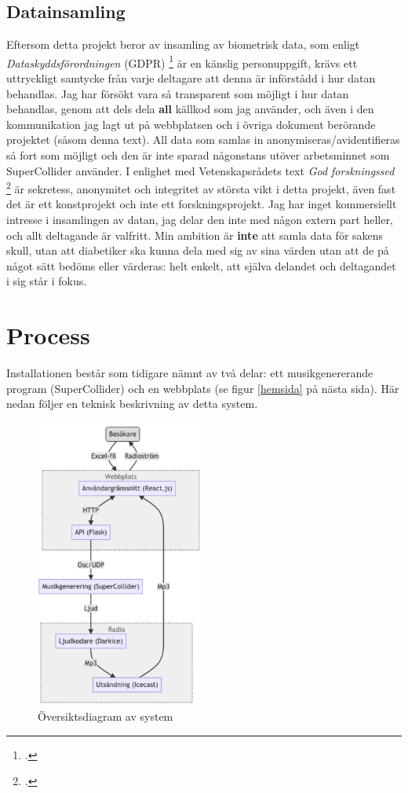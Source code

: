 \documentclass[11pt, a4paper]{article} %
\begin{document}
\subsection*{Datainsamling}
Eftersom detta projekt beror av insamling av biometrisk data, som enligt \emph{Dataskyddsförordningen} (GDPR) \footcite{integritetsskyddsmyndigheten_kansliga_nodate} är en känslig personuppgift, krävs ett uttryckligt samtycke från varje deltagare att denna är införstådd i hur datan behandlas. Jag har försökt vara så transparent som möjligt i hur datan behandlas, genom att dels dela \textbf{all} källkod som jag använder, och även i den kommunikation jag lagt ut på webbplatsen och i övriga dokument berörande projektet (såsom denna text). All data som samlas in anonymiseras/avidentifieras så fort som möjligt och den är inte sparad någonstans utöver arbetsminnet som SuperCollider använder. I enlighet med Vetenskapsrådets text \emph{God forskningssed} \footcite[s. 40-41]{vetenskapsradet_god_2017} är sekretess, anonymitet och integritet av största vikt i detta projekt, även fast det är ett konstprojekt och inte ett forskningsprojekt. Jag har inget kommersiellt intresse i insamlingen av datan, jag delar den inte med någon extern part heller, och allt deltagande är valfritt. Min ambition är \textbf{inte} att samla data för sakens skull, utan att diabetiker ska kunna dela med sig av sina värden utan att de på något sätt bedöms eller värderas: helt enkelt, att själva delandet och deltagandet i sig står i fokus. 

\section*{Process}
Installationen består som tidigare nämnt av två delar: ett musikgenererande program (SuperCollider) och en webbplats (se figur \ref{hemsida} på nästa sida). Här nedan följer en teknisk beskrivning av detta system.

\begin{figure}[H]
\centering
\includegraphics[width=0.5\textwidth]{../media/flowchart.png}
\caption{Översiktsdiagram av system}
\end{figure}
\end{document}
